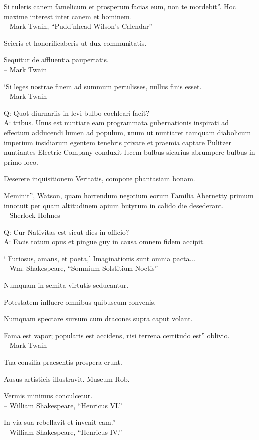 \documentclass[titlepage,12pt]{memoir}
\begin{document}
Si tuleris canem famelicum et prosperum facias eum, non te mordebit”.
Hoc maxime interest inter canem et hominem.
\\-- Mark Twain, “Pudd’nhead Wilson’s Calendar”

 Scieris et honorificaberis ut dux communitatis.

Sequitur de affluentia paupertatis.
\\-- Mark Twain

‘Si leges nostrae finem ad summum pertulisses, nullus finis esset.
\\-- Mark Twain

Q: Quot diurnariis in levi bulbo cochleari facit?\\
A: tribus. Unus est nuntiare eam programmata gubernationis inspirati ad effectum adducendi
lumen ad populum, unum ut nuntiaret tamquam diabolicum imperium insidiarum
egentem tenebris privare et praemia captare Pulitzer
nuntiantes Electric Company conduxit lucem bulbus sicarius abrumpere
bulbus in primo loco.

Deserere inquisitionem Veritatis, compone phantasiam bonam.

Meminit”, Watson, quam horrendum negotium eorum
Familia Abernetty primum innotuit per quam altitudinem
apium butyrum in calido die desederant.
\\-- Sherlock Holmes

Q: Cur Nativitas est sicut dies in officio?\\
A: Facis totum opus et pingue guy in causa
omnem fidem accipit.

‘ Furiosus, amans, et poeta,’
Imaginationis sunt omnia pacta...
\\-- Wm. Shakespeare, “Somnium Solstitium Noctis”

Numquam in semita virtutis seducantur.

Potestatem influere omnibus quibuscum convenis.

Numquam spectare sursum cum dracones supra caput volant.

Fama est vapor; popularis est accidens, nisi terrena certitudo est”
oblivio.
\\-- Mark Twain

Tua consilia praesentis prospera erunt.

Ausus artisticis illustravit. Museum Rob.

Vermis minimus conculcetur.
\\-- William Shakespeare, “Henricus VI.”

In via sua rebellavit et invenit eam.”
\\-- William Shakespeare, “Henricus IV.”
\end{document}
